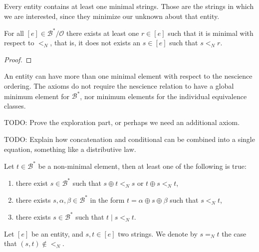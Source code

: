 Every entity contains at least one minimal strings. Those are the strings in which we are interested, since they minimize our unknown about that entity.

\begin{proposition}
For all $[e] \in \mathcal{B}^\ast / \mathcal{O}$ there exists at least one $r \in [e]$ such that it is minimal with respect to $<_N$, that is, it does not exists an $s \in [e]$ such that $s <_N r$.
\end{proposition}
\begin{proof}
\end{proof}

An entity can have more than one minimal element with respect to the nescience ordering. The axioms do not require the nescience relation to have a global minimum element for $\mathcal{B}^\ast$, nor minimum elements for the individual equivalence classes.


\begin{proposition}
{\color{red} TODO: Prove the exploration part, or perhaps we need an additional axiom.}
\end{proposition}


\begin{proposition}
{\color{red} TODO: Explain how concatenation and conditional can be combined into a single equation, something like a distributive law.}
\end{proposition}


\begin{definition}[Axiom A13]
Let $t \in \mathcal{B}^\ast$ be a non-minimal element, then at least one of the following is true:
\begin{enumerate}[label=(\roman*)]
\item there exist $s \in \mathcal{B}^\ast$ such that $s \oplus t <_N s$ or $t \oplus s <_N t$,
\item there exists $s, \alpha, \beta \in \mathcal{B}^\ast$ in the form $t = \alpha \oplus s \oplus \beta$ such that $s <_N t$,
\item there exists $s \in \mathcal{B}^\ast$ such that $t \mid s <_N t$.
\end{enumerate}
\end{definition}











\begin{notation}
Let $[e]$ be an entity, and $s, t \in [e]$ two strings. We denote by $ s =_N t$ the case that $(s, t) \notin <_N$.
\end{notation}

